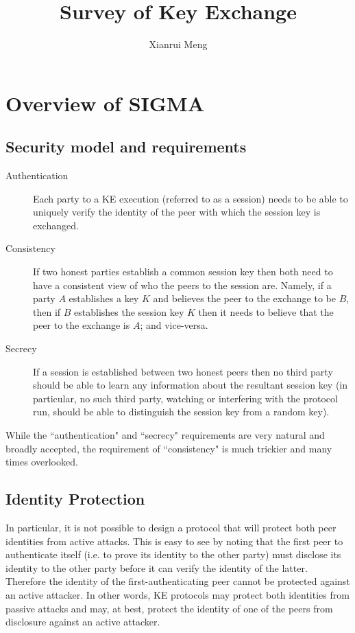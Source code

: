 \documentclass[11pt]{article}
\title{Survey of Key Exchange}
\author{Xianrui Meng}
\begin{document}
\maketitle
\section{Overview of SIGMA}
\subsection{Security model and requirements}
\begin{description}
\item[Authentication] Each party to a KE execution (referred to as a session) needs to be able to
uniquely verify the identity of the peer with which the session key is exchanged.
\item[Consistency] If two honest parties establish a common session key then both need to have a
consistent view of who the peers to the session are. Namely, if a party $A$ establishes a key $K$
and believes the peer to the exchange to be $B$, then if $B$ establishes the session key $K$ then
it needs to believe that the peer to the exchange is $A$; and vice-versa.
\item[Secrecy] If a session is established between two honest peers then no third party should be able
to learn any information about the resultant session key (in particular, no such third party, watching or interfering with the protocol run, should be able to distinguish the session key from a random key).
\end{description}
While the ``authentication" and ``secrecy" requirements are very natural and broadly accepted,
the requirement of ``consistency" is much trickier and many times overlooked.

\subsection{Identity Protection}
In particular, it is not possible to design a protocol that will protect both peer identities from active attacks. This is easy to see by noting that the first peer to authenticate itself (i.e. to prove its identity to the other party) must disclose its identity to the other party before it can verify the identity of the latter. Therefore the identity of the first-authenticating peer cannot be protected against an active attacker. In other words, KE protocols may protect both identities from passive attacks and may, at best, protect the identity of one of the peers from disclosure against an active attacker.
\end{document}
